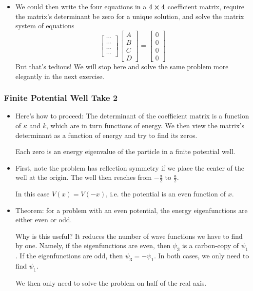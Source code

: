 \documentclass[11pt, a4paper]{article}
\begin{document}
\begin{itemize}
	\item We could then write the four equations in a $ 4 \cross 4 $ coefficient matrix, require the matrix's determinant be zero for a unique solution, and solve the matrix system of equations
	\begin{equation*}
		\begin{bmatrix}
			\cdots \\
			\cdots \\
			\cdots \\
			\cdots 
		\end{bmatrix}
		\begin{bmatrix}
			A\\
			B\\
			C\\
			D
		\end{bmatrix}
		 = 
		 \begin{bmatrix}
		 	0\\
		 	0\\
		 	0\\
		 	0
		 \end{bmatrix}
	\end{equation*}
	But that's tedious! We will stop here and solve the same problem more elegantly in the next exercise.
	
\end{itemize}

\subsubsection{Finite Potential Well Take 2}
\begin{itemize}
	\item Here's how to proceed: The determinant of the coefficient matrix is a function of $ \kappa $ and $ k $, which are in turn functions of energy. We then view the matrix's determinant as a function of energy and try to find its zeros.
		
	Each zero is an energy eigenvalue of the particle in a finite potential well.
	
	\item First, note the problem has reflection symmetry if we place the center of the well at the origin. The well then reaches from $ -\frac{a}{2} $ to $ \frac{a}{2} $. 
	
	In this case $ V(x) = V(-x) $, i.e. the potential is an even function of $ x $. 
	
	\item Theorem: for a problem with an even potential, the energy eigenfunctions are either even or odd.
	
	Why is this useful? It reduces the number of wave functions we have to find by one. Namely, if the eigenfunctions are even, then $ \psi_{3} $ is a carbon-copy of $ \psi_{1} $. If the eigenfunctions are odd, then $ \psi_{3} = - \psi_{1} $. In both cases, we only need to find $ \psi_{1} $. 
	
	We then only need to solve the problem on half of the real axis.
\end{itemize}
\end{document}
